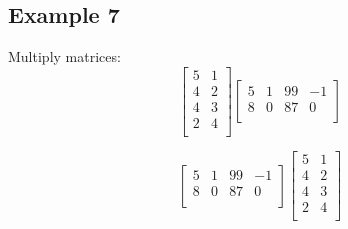 \documentclass{article}
\begin{document}
\subsection{Example 7}
Multiply matrices:
\begin{equation}
	\left[
	\begin{array}{cc}
		5 & 1 \\
		4 & 2 \\
		4 & 3 \\
		2 & 4 \\  
	\end{array}
	\right]
	\left[
	\begin{array}{cccc}
		 
		5 & 1 & 99 & -1\\
		8 & 0 & 87 & 0\\
		
	\end{array}
\right]
\end{equation}

\begin{equation}
	\left[
	\begin{array}{cccc}
	
	5 & 1 & 99 & -1\\
	8 & 0 & 87 & 0\\
	
\end{array}
	\right]
	\left[
	\begin{array}{cc}
	5 & 1 \\
	4 & 2 \\
	4 & 3 \\
	2 & 4 \\  
\end{array}
	\right]
\end{equation}
\end{document}
